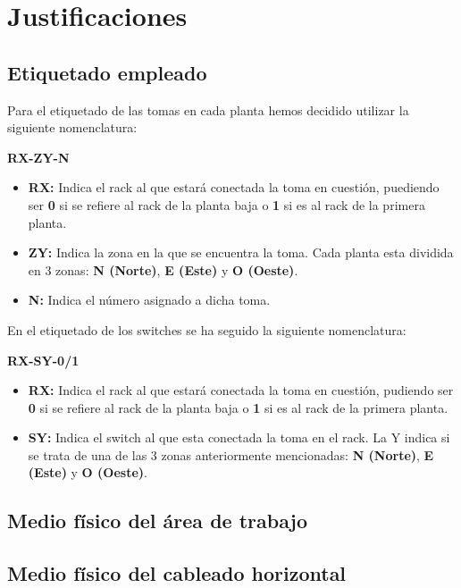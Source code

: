 \section{Justificaciones}
\subsection{Etiquetado empleado}
Para el etiquetado de las tomas en cada planta hemos decidido utilizar la siguiente nomenclatura:
\begin{center}
    \textbf{RX-ZY-N}
\end{center}

\begin{itemize}
    \item \textbf{RX:} Indica el rack al que estará conectada la toma en cuestión, puediendo ser \textbf{0} si se refiere al rack de la planta baja o \textbf{1} si es al rack de la primera planta.
    \item \textbf{ZY:} Indica la zona en la que se encuentra la toma. Cada planta esta dividida en 3 zonas: \textbf{N (Norte)}, \textbf{E (Este)} y \textbf{O (Oeste)}.
    \item \textbf{N:} Indica el número asignado a dicha toma.
\end{itemize}

En el etiquetado de los switches se ha seguido la siguiente nomenclatura:

\begin{center}
    \textbf{RX-SY-0/1}
\end{center}

\begin{itemize}
    \item \textbf{RX:} Indica el rack al que estará conectada la toma en cuestión, pudiendo ser \textbf{0} si se refiere al rack de la planta baja o \textbf{1} si es al rack de la primera planta.
    \item \textbf{SY:} Indica el switch al que esta conectada la toma en el rack. La Y indica si se trata de una de las 3 zonas anteriormente mencionadas: \textbf{N (Norte)}, \textbf{E (Este)} y \textbf{O (Oeste)}.
\end{itemize}

\subsection{Medio físico del área de trabajo}
\subsection{Medio físico del cableado horizontal}
